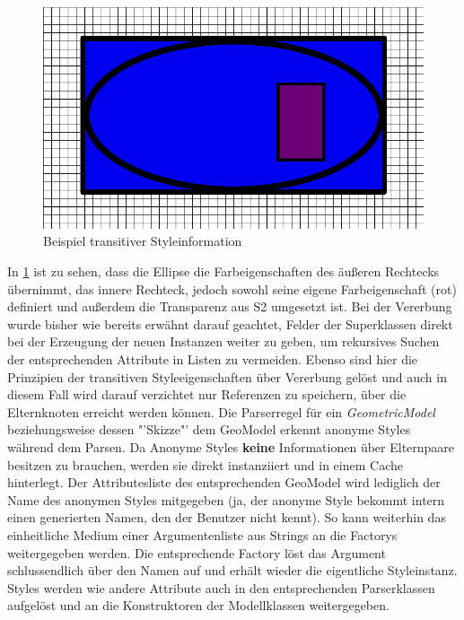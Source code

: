 \begin{figure}[H]
\begin{center}
\includegraphics[scale = 0.5]{Bilder/transitiveStyle.png}
\caption{Beispiel transitiver Styleinformation}
\label{transitiveStyleExample}
\end{center}
\end{figure}
In \ref{transitiveStyleExample} ist zu sehen, dass die Ellipse die Farbeigenschaften des äußeren Rechtecks übernimmt, das innere Rechteck, jedoch sowohl seine eigene Farbeigenschaft (rot) definiert und außerdem die Transparenz aus S2 umgesetzt ist.
Bei der Vererbung wurde bisher wie bereits erwähnt darauf geachtet, Felder der Superklassen direkt bei der Erzeugung der neuen Instanzen weiter zu geben, um rekursives Suchen der entsprechenden Attribute in Listen zu vermeiden. Ebenso sind hier die Prinzipien der transitiven Styleeigenschaften über Vererbung gelöst und auch in diesem Fall wird darauf verzichtet nur Referenzen zu speichern, über die Elternknoten erreicht werden können.
Die Parserregel für ein \textit{GeometricModel} beziehungsweise dessen "'Skizze"' dem GeoModel erkennt anonyme Styles während dem Parsen. Da Anonyme Styles \textbf{keine} Informationen über Elternpaare besitzen zu brauchen, werden sie direkt instanziiert und in einem Cache hinterlegt. Der Attributesliste des entsprechenden GeoModel wird lediglich der Name des anonymen Styles mitgegeben (ja, der anonyme Style bekommt intern einen generierten Namen, den der Benutzer nicht kennt). So kann weiterhin das einheitliche Medium einer Argumentenliste aus Strings an die Factorys weitergegeben werden. Die entsprechende Factory löst das Argument schlussendlich über den Namen auf und erhält wieder die eigentliche Styleinstanz.
Styles werden wie andere Attribute auch in den entsprechenden Parserklassen aufgelöst und an die Konstruktoren der Modellklassen weitergegeben.
